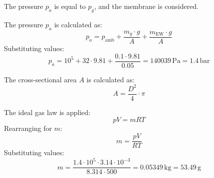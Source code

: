 The pressure \( p_a \) is equal to \( p_g \), and the membrane is considered.  

The pressure \( p_a \) is calculated as:  
\[
p_a = p_{\text{amb}} + \frac{m_g \cdot g}{A} + \frac{m_{\text{EW}} \cdot g}{A}
\]  
Substituting values:  
\[
p_a = 10^5 + 32 \cdot 9.81 + \frac{0.1 \cdot 9.81}{0.05} = 140039 \, \text{Pa} = 1.4 \, \text{bar}
\]  

The cross-sectional area \( A \) is calculated as:  
\[
A = \frac{D^2}{4} \cdot \pi
\]  

The ideal gas law is applied:  
\[
pV = mRT
\]  
Rearranging for \( m \):  
\[
m = \frac{pV}{RT}
\]  
Substituting values:  
\[
m = \frac{1.4 \cdot 10^5 \cdot 3.14 \cdot 10^{-3}}{8.314 \cdot 500} = 0.05349 \, \text{kg} = 53.49 \, \text{g}
\]